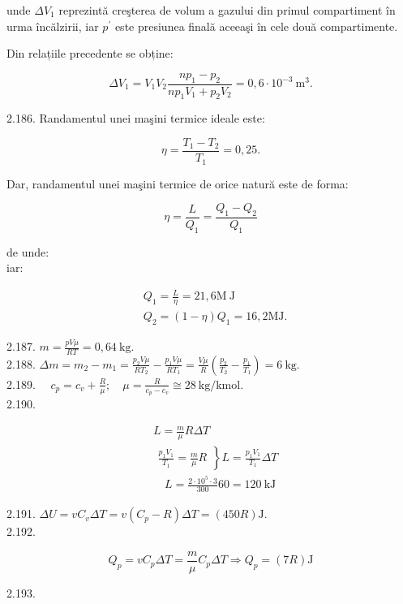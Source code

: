 unde $\Delta V_{1}$ reprezintă creşterea de volum a gazului din primul compartiment în urma încălzirii, iar $p^{\prime}$ este presiunea finală aceeaşi în cele două compartimente.

Din relațiile precedente se obține:

$$
\Delta V_{1}=V_{1} V_{2} \frac{n p_{1}-p_{2}}{n p_{1} V_{1}+p_{2} V_{2}}=0,6 \cdot 10^{-3} \mathrm{~m}^{3} .
$$

2.186. Randamentul unei maşini termice ideale este:

$$
\eta=\frac{T_{1}-T_{2}}{T_{1}}=0,25 .
$$

Dar, randamentul unei maşini termice de orice natură este de forma:

$$
\eta=\frac{L}{Q_{1}}=\frac{Q_{1}-Q_{2}}{Q_{1}}
$$

de unde:\\
iar:

$$
\begin{aligned}
& Q_{1}=\frac{L}{\eta}=21,6 \mathrm{M} \mathrm{~J} \\
& Q_{2}=(1-\eta) Q_{1}=16,2 \mathrm{MJ} .
\end{aligned}
$$

2.187. $m=\frac{p V \mu}{R T}=0,64 \mathrm{~kg}$.\\
2.188. $\Delta m=m_{2}-m_{1}=\frac{p_{2} V \mu}{R T_{2}}-\frac{p_{1} V \mu}{R T_{1}}=\frac{V \mu}{R}\left(\frac{p_{2}}{T_{2}}-\frac{p_{1}}{T_{1}}\right)=6 \mathrm{~kg}$.\\
2.189. $\quad c_{p}=c_{v}+\frac{R}{\mu} ; \quad \mu=\frac{R}{c_{p}-c_{v}} \cong 28 \mathrm{~kg} / \mathrm{kmol}$.\\
2.190.

$$
\begin{aligned}
& L=\frac{m}{\mu} R \Delta T \\
& \left.\begin{array}{l}
\frac{p_{1} V_{1}}{T_{1}}=\frac{m}{\mu} R
\end{array}\right\} L=\frac{p_{1} V_{1}}{T_{1}} \Delta T \\
& \quad L=\frac{2 \cdot 10^{5} \cdot 3}{300} 60=120 \mathrm{~kJ}
\end{aligned}
$$

2.191. $\Delta U=v C_{v} \Delta T=v\left(C_{p}-R\right) \Delta T=(450 R) \mathrm{J}$.\\
2.192.

$$
Q_{p}=v C_{p} \Delta T=\frac{m}{\mu} C_{p} \Delta T \Rightarrow Q_{p}=(7 R) \mathrm{J}
$$

2.193.

